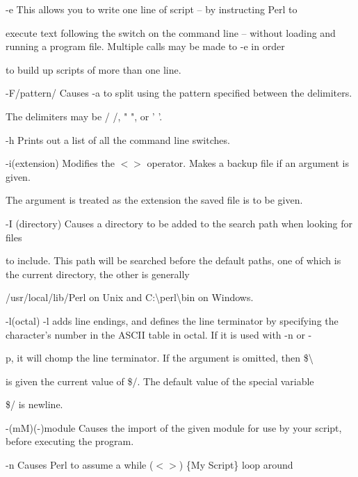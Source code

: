 \documentclass[a4paper,11pt]{book}
\begin{document}
\noindent -e This allows you to write one line of script -- by instructing Perl to

\noindent execute text following the switch on the command line -- without loading and running a program file. Multiple calls may be made to -e in order

\noindent to build up scripts of more than one line.

\noindent 

\noindent -F/pattern/ Causes -a to split using the pattern specified between the delimiters.

\noindent The delimiters may be / /, " ",   or ' '.

\noindent 

\noindent -h Prints out a list of all the command line switches.

\noindent 

\noindent -i(extension) Modifies the $<$$>$ operator. Makes a backup file if an argument is given.

\noindent The argument is treated as the extension the saved file is to be given.

\noindent 

\noindent -I (directory) Causes a directory to be added to the search path when looking for files

\noindent to include. This path will be searched before the default paths, one of which is the current directory, the other is generally

\noindent /usr/local/lib/Perl on Unix and C:\textbackslash perl\textbackslash bin on Windows.

\noindent 

\noindent -l(octal) -l adds line endings, and defines the line terminator by specifying the character's number in the ASCII table in octal. If it is used with -n or -

\noindent p, it will chomp the line terminator. If the argument is omitted, then \$\textbackslash 

\noindent is given the current value of \$/. The default value of the special variable

\noindent \$/ is newline.

\noindent 

\noindent -(mM)(-)module Causes the import of the given module for use by your script, before executing the program.

\noindent 

\noindent -n Causes Perl to assume a while ($<$$>$) \{My Script\} loop around
\end{document}
